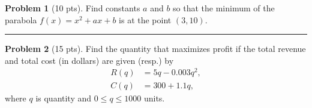 \documentclass[12pt]{article}
\theoremstyle{definition}
\newtheorem{problem}{Problem}
\begin{document}
\begin{problem}[10 pts]
Find constants $a$ and $b$ so that the minimum of the parabola $f(x) = x^2 + ax + b$ is at the point $(3,10)$.

\vspace{9cm}
\end{problem}
\hrule

\begin{problem}[15 pts]
Find the quantity that maximizes profit if the total revenue and total cost (in dollars) are given (resp.) by 
\begin{align*}
R(q) &= 5q - 0.003q^2, \\
C(q) &= 300 + 1.1q,
\end{align*}
where $q$ is quantity and $0 \leq q \leq 1000$ units.  
\end{problem}
\end{document}
